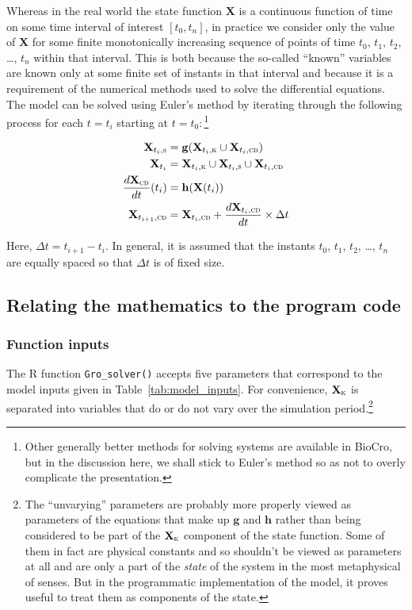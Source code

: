 \documentclass{article}\usepackage[]{graphicx}\usepackage[]{color}
\newcommand{\Rcode}[1]{\lstinline[style=Rstyle]{#1}}
\newcommand{\boldX}{\mathbf{X}}
\newcommand{\cd}{\textsc{cd}}
\newcommand{\kn}{\textsc{k}} %
\newcommand{\s}{\textsc{s}} %
\newcommand{\g}{\mathbf{g}}
\newcommand{\h}{\mathbf{h}}
\begin{document}
Whereas in the real world the state function $\boldX$ is a continuous
function of time on some time interval of interest $[t_0, t_n]$, in
practice we consider only the value of $\boldX$ for some finite
monotonically increasing sequence of points of time $t_0$, $t_1$,
$t_2$, \dots, $t_n$ within that interval.  This is both because the
so-called ``known'' variables are known only at some finite set of
instants in that interval and because it is a requirement of the
numerical methods used to solve the differential equations. The model
can be solved using Euler's method by iterating through the following
process for each $t=t_i$ starting at $t = t_0$:\,\footnote{Other
generally better methods for solving systems are available in BioCro,
but in the discussion here, we shall stick to Euler's method so as not
to overly complicate the presentation.}

\begin{align}
  \label{eq:solver_loop}
  \begin{split}
	\boldX_{t_i,\s} &= \g(\boldX_{t_i,\kn} \cup \boldX_{t_i,\cd}) \\
    \boldX_{t_i} &= \boldX_{t_i,\kn}  \cup \boldX_{t_i,\s} \cup \boldX_{t_i,\cd} \\
    \frac{d\boldX_\cd}{dt}(t_i) &= \h(\boldX(t_i))  \\
    \boldX_{t_{i+1},\cd} &= \boldX_{t_i,\cd} + \frac{d\boldX_{t_i,\cd}}{dt} \times \Delta t
  \end{split}
\end{align}

Here, $\Delta t = t_{i+1} - t_i$.  In general, it is assumed that the
instants $t_0$, $t_1$, $t_2$, \dots, $t_n$ are equally spaced so that $\Delta
t$ is of fixed size.



\subsection{Relating the mathematics to the program code}
\subsubsection{Function inputs}
\label{sec:solver_inputs}

The R function \Rcode{Gro_solver()} accepts five parameters that
correspond to the model inputs given in
Table~\ref{tab:model_inputs}. For convenience, $\boldX_\kn$ is
separated into variables that do or do not vary over the simulation
period.\footnote{The ``unvarying'' parameters are probably more
  properly viewed as parameters of the equations that make up $\g$ and
  $\h$ rather than being considered to be part of the $\boldX_\kn$
  component of the state function.  Some of them in fact are physical
  constants and so shouldn't be viewed as parameters at all and are
  only a part of the \emph{state} of the system in the most
  metaphysical of senses.  But in the programmatic implementation of
  the model, it proves useful to treat them as components of the
  state.}
\end{document}
